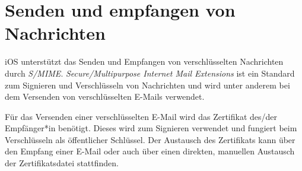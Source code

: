 \section{Senden und empfangen von Nachrichten}

iOS unterstützt das Senden und Empfangen von verschlüsselten Nachrichten durch
\textit{S/MIME}. \textit{Secure/Multipurpose Internet Mail Extensions} ist ein
Standard zum Signieren und Verschlüsseln von Nachrichten und wird unter anderem
bei dem Versenden von verschlüsselten E-Mails verwendet.

Für das Versenden einer verschlüsselten E-Mail wird das Zertifikat des/der
Empfänger*in benötigt.  Dieses wird zum Signieren verwendet und fungiert beim
Verschlüsseln als öffentlicher Schlüssel.  Der Austausch des Zertifikats kann
über den Empfang einer E-Mail oder auch über einen direkten, manuellen Austausch
der Zertifikatsdatei stattfinden.

